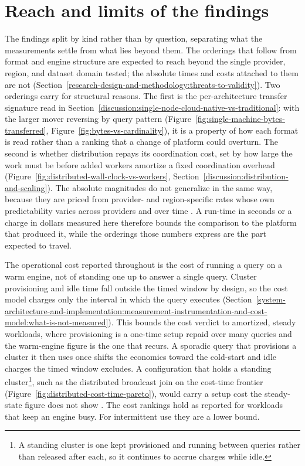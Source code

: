 \section{Reach and limits of the findings}
\label{discussion:reach-and-limits}

The findings split by kind rather than by question, separating what the measurements settle from what lies beyond them. The orderings that follow from format and engine structure are expected to reach beyond the single provider, region, and dataset domain tested; the absolute times and costs attached to them are not (Section~\ref{research-design-and-methodology:threats-to-validity}). Two orderings carry for structural reasons. The first is the per-architecture transfer signature read in Section~\ref{discussion:single-node-cloud-native-vs-traditional}: with the larger mover reversing by query pattern (Figure~\ref{fig:single-machine-bytes-transferred}, Figure~\ref{fig:bytes-vs-cardinality}), it is a property of how each format is read rather than a ranking that a change of platform could overturn. The second is whether distribution repays its coordination cost, set by how large the work must be before added workers amortize a fixed coordination overhead (Figure~\ref{fig:distributed-wall-clock-vs-workers}, Section~\ref{discussion:distribution-and-scaling}). The absolute magnitudes do not generalize in the same way, because they are priced from provider- and region-specific rates whose own predictability varies across providers and over time \parencite{leitner2016_patterns_chaos_iaas,iosup2011_performance_variability_cloud_services,schad2010_runtime_measurements_cloud}. A run-time in seconds or a charge in dollars measured here therefore bounds the comparison to the platform that produced it, while the orderings those numbers express are the part expected to travel.

The operational cost reported throughout is the cost of running a query on a warm engine, not of standing one up to answer a single query. Cluster provisioning and idle time fall outside the timed window by design, so the cost model charges only the interval in which the query executes (Section~\ref{system-architecture-and-implementation:measurement-instrumentation-and-cost-model:what-is-not-measured}). This bounds the cost verdict to amortized, steady workloads, where provisioning is a one-time setup repaid over many queries and the warm-engine figure is the one that recurs. A sporadic query that provisions a cluster it then uses once shifts the economics toward the cold-start and idle charges the timed window excludes. A configuration that holds a standing cluster\footnote{A standing cluster is one kept provisioned and running between queries rather than released after each, so it continues to accrue charges while idle.}, such as the distributed broadcast join on the cost-time frontier (Figure~\ref{fig:distributed-cost-time-pareto}), would carry a setup cost the steady-state figure does not show \parencite{databricks2024_cost_optimization_best_practices,jonas2019_berkeley_view_on_serverless_computing}. The cost rankings hold as reported for workloads that keep an engine busy. For intermittent use they are a lower bound.

